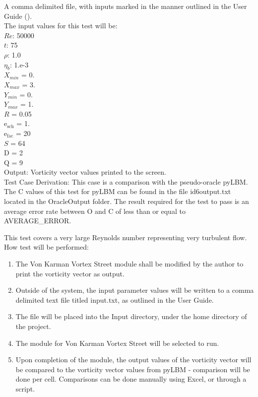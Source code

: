 \documentclass[12pt, titlepage]{article}
\begin{document}
\begin{enumerate}
A comma delimited file, with inputs marked in the manner outlined in the User
Guide (\citet{LBM_UserGuide_PM}).\\The input values for this test will be:\\
$Re$: 50000\\
$t$: 75\\
$\rho$: 1.0\\
$\eta_b$: 1.e-3\\
$X_{min}$ = 0.\\
$X_{max}$ = 3.\\
$Y_{min}$ = 0.\\
$Y_{max}$ = 1.\\
$R$ = 0.05\\
$\mathrm{e_{sch}}$ = 1.\\
$\mathrm{e_{fac}}$ = 20\\
$S$ = 64\\
$\mathrm{D}$ = 2\\
$\mathrm{Q}$ = 9\\

Output: Vorticity vector values printed to the screen. \\

Test Case Derivation: This case is a comparison with the pseudo-oracle
pyLBM. The C values of this test for pyLBM can be found in the file
id6output.txt located in the OracleOutput folder. The result required for the
test to pass is an average error rate between O and C of less than or equal to
AVERAGE\_ERROR.

This test covers a very large Reynolds number representing very turbulent flow.\\	
					
How test will be performed: 

\begin{enumerate}
\item The Von Karman Vortex Street module shall be modified by the author to
  print the vorticity vector as output.
\item Outside of the system, the input parameter values will be written to a
  comma delimited text file titled input.txt, as outlined in the User Guide.
\item The file will be placed into the Input directory, under the home directory of the project.
\item The module for Von Karman Vortex Street will be selected to run.
\item Upon completion of the module, the output values of the vorticity vector
  will be compared to the vorticity vector values from pyLBM - comparison will
  be done per cell. Comparisons can be done manually using Excel, or through a
  script.
\end{enumerate}


\end{enumerate}
\end{document}
